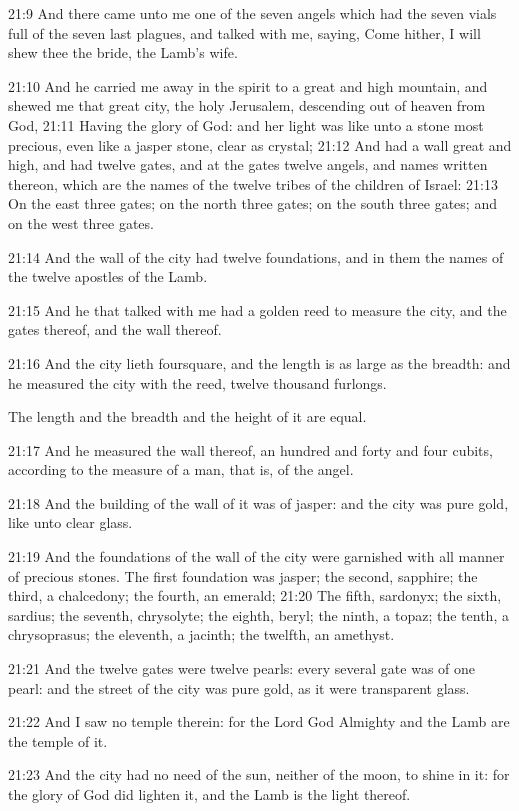 21:9 And there came unto me one of the seven angels which had the
seven vials full of the seven last plagues, and talked with me,
saying, Come hither, I will shew thee the bride, the Lamb's wife.

21:10 And he carried me away in the spirit to a great and high
mountain, and shewed me that great city, the holy Jerusalem,
descending out of heaven from God, 21:11 Having the glory of God: and
her light was like unto a stone most precious, even like a jasper
stone, clear as crystal; 21:12 And had a wall great and high, and had
twelve gates, and at the gates twelve angels, and names written
thereon, which are the names of the twelve tribes of the children of
Israel: 21:13 On the east three gates; on the north three gates; on
the south three gates; and on the west three gates.

21:14 And the wall of the city had twelve foundations, and in them the
names of the twelve apostles of the Lamb.

21:15 And he that talked with me had a golden reed to measure the
city, and the gates thereof, and the wall thereof.

21:16 And the city lieth foursquare, and the length is as large as the
breadth: and he measured the city with the reed, twelve thousand
furlongs.

The length and the breadth and the height of it are equal.

21:17 And he measured the wall thereof, an hundred and forty and four
cubits, according to the measure of a man, that is, of the angel.

21:18 And the building of the wall of it was of jasper: and the city
was pure gold, like unto clear glass.

21:19 And the foundations of the wall of the city were garnished with
all manner of precious stones. The first foundation was jasper; the
second, sapphire; the third, a chalcedony; the fourth, an emerald;
21:20 The fifth, sardonyx; the sixth, sardius; the seventh,
chrysolyte; the eighth, beryl; the ninth, a topaz; the tenth, a
chrysoprasus; the eleventh, a jacinth; the twelfth, an amethyst.

21:21 And the twelve gates were twelve pearls: every several gate was
of one pearl: and the street of the city was pure gold, as it were
transparent glass.

21:22 And I saw no temple therein: for the Lord God Almighty and the
Lamb are the temple of it.

21:23 And the city had no need of the sun, neither of the moon, to
shine in it: for the glory of God did lighten it, and the Lamb is the
light thereof.

